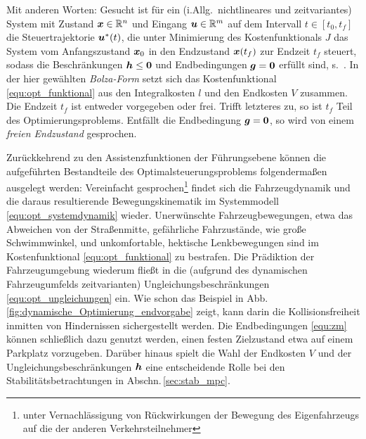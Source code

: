 Mit anderen Worten: Gesucht ist für ein (i.Allg.\ nichtlineares und zeitvariantes) System mit Zustand $\boldsymbol{x} \in \mathbb R^n$ und Eingang $\boldsymbol{u} \in \mathbb R^m$ auf dem Intervall $t\in[t_0, t_f]$ die Steuertrajektorie $\boldsymbol{u}^\ast(t)$, die unter Minimierung des Kostenfunktionals $J$ das System vom Anfangszustand $\boldsymbol{x}_0$ in den Endzustand $\boldsymbol{x}(t_f)$ zur Endzeit $t_f$ steuert, sodass die Beschränkungen $\boldsymbol{h} \leq \boldsymbol{0}$ und Endbedingungen $\boldsymbol{g}= \boldsymbol{0}$ erfüllt sind, s.\ . In der hier gewählten \emph{Bolza-Form} \cite{papageorgiou2012optimierung} setzt sich das Kostenfunktional \eqref{equ:opt_funktional} aus den Integralkosten $l$ und den Endkosten $V$ zusammen.\\
Die Endzeit $t_f$ ist entweder vorgegeben oder frei. Trifft letzteres zu, so ist $t_f$ Teil des Optimierungsproblems. Entfällt die Endbedingung $\boldsymbol{g}=\boldsymbol{0}$, so wird von einem \emph{freien Endzustand} gesprochen. 

Zurückkehrend zu den Assistenzfunktionen der Führungsebene können die aufgeführten Bestandteile des Optimalsteuerungsproblems folgendermaßen ausgelegt werden:  Vereinfacht gesprochen\footnote{unter Vernachlässigung von Rückwirkungen der Bewegung des Eigenfahrzeugs auf die der anderen Verkehrsteilnehmer} findet sich die Fahrzeugdynamik und die daraus resultierende Bewegungskinematik im Systemmodell \eqref{equ:opt_systemdynamik} wieder. Unerwünschte Fahrzeugbewegungen, etwa das Abweichen von der Straßenmitte, gefährliche Fahrzustände, wie große Schwimmwinkel, und unkomfortable, hektische Lenkbewegungen sind im Kostenfunktional \eqref{equ:opt_funktional} zu bestrafen. Die Prädiktion der Fahrzeugumgebung wiederum fließt in die (aufgrund des dynamischen Fahrzeugumfelds \iA zeitvarianten) Ungleichungsbeschränkungen \eqref{equ:opt_ungleichungen} 
ein. Wie schon das Beispiel in Abb.\,\ref{fig:dynamische_Optimierung_endvorgabe} zeigt, kann darin die Kollisionsfreiheit inmitten von Hindernissen sichergestellt werden. Die Endbedingungen \eqref{equ:zm} können schließlich dazu genutzt werden, einen festen Zielzustand etwa auf einem Parkplatz vorzugeben. Darüber hinaus spielt die Wahl der Endkosten $V$ und der Ungleichungsbeschränkungen $\boldsymbol{h}$ eine entscheidende Rolle bei den Stabilitätsbetrachtungen in Abschn.\,\ref{sec:stab_mpc}.

